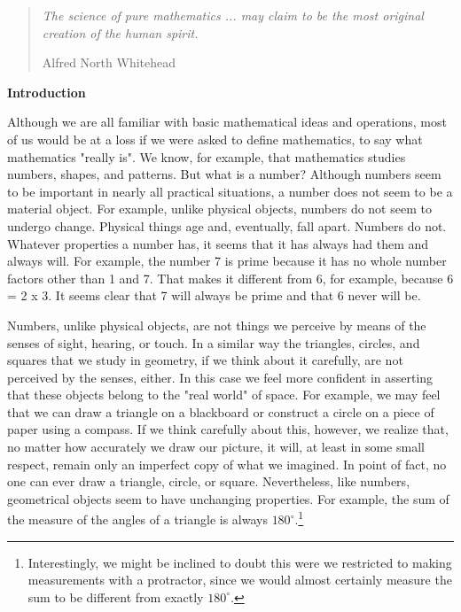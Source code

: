 \noindent
\begin{quotation}
\textit{The science of pure mathematics ... may claim to be the most original creation of the human spirit.}
\begin{flushright}
Alfred North Whitehead
\end{flushright}
\end{quotation}
\noindent
\textbf{Introduction}

     Although we are all familiar with basic mathematical ideas and operations, most of us would be at a loss if we were asked to define mathematics, to say what mathematics "really is".  We know, for example, that mathematics studies numbers, shapes, and patterns.  But what is a number?  Although numbers seem to be important in nearly all practical situations, a number does not seem to be a material object.  For example, unlike physical objects, numbers do not seem to undergo change.  Physical things age and, eventually, fall apart.  Numbers do not.  Whatever properties a number has, it seems that it has always had them and always will.  For example, the number 7 is prime because it has no whole number factors other than 1 and 7.  That makes it different from 6, for example, because 6 = 2 x 3.  It seems clear that 7 will always be prime and that 6 never will be. 
      
     
     Numbers, unlike physical objects, are not things we perceive by means of the senses of  sight, hearing, or touch.  In a similar way the triangles, circles, and squares that we study in geometry, if we think about it carefully, are not perceived by the senses, either.  In this case we feel more confident in asserting that these objects belong to the "real world" of space.  For example, we may feel that we can draw a triangle on a blackboard or construct a circle on a piece of paper using a compass.  If we think carefully about this, however, we realize that, no matter how accurately we draw our picture, it will, at least in some small respect, remain only an imperfect copy of what we imagined.  In point of fact, no one can ever draw a triangle, circle, or square.  Nevertheless, like numbers, geometrical objects seem to have unchanging properties.  For example, the sum of the measure of the angles of a triangle is always $180^{\circ}$.\footnote{Interestingly, we might be inclined to doubt this were we restricted to making measurements with a protractor, since we would almost certainly measure the sum to be different from exactly $180^{\circ}$. }
     
